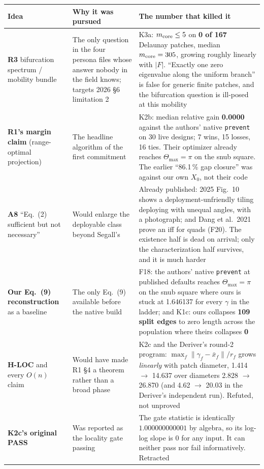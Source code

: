 \documentclass[10pt,a4paper]{article}
\begin{document}
\begin{table}[h]\centering\small
\begin{tabular}{@{}p{42mm}p{55mm}p{55mm}@{}}
\toprule
Idea & Why it was pursued & The number that killed it \\
\midrule
\textbf{R3} bifurcation spectrum / mobility bundle & The only question in the four persona files whose answer nobody in the field knows; targets 2026 \S6 limitation 2 & K3a: $m_{\rm core}\le5$ on \textbf{0 of 167} Delaunay patches, median $m_{\rm core} = 305$, growing roughly linearly with $|F|$. ``Exactly one zero eigenvalue along the uniform branch'' is false for generic finite patches, and the bifurcation question is ill-posed at this mobility \\
\textbf{R1's margin claim} (range-optimal projection) & The headline algorithm of the first commitment & K2b: median relative gain \textbf{0.0000} against the authors' native \texttt{prevent} on 30 live designs; 7 wins, 15 losses, 16 ties. Their optimizer already reaches $\Theta_{\max} = \pi$ on the snub square. The earlier ``86.1\,\% gap closure'' was against our own $X_0$, not their code \\
\textbf{A8} ``Eq.~(2) sufficient but not necessary'' & Would enlarge the deployable class beyond Segall's & Already published: 2025 Fig.~10 shows a deployment-unfriendly tiling deploying with unequal angles, with a photograph; and Dang et al.\ 2021 prove an iff for quads (F20). The existence half is dead on arrival; only the characterization half survives, and it is much harder \\
\textbf{Our Eq.~(9) reconstruction} as a baseline & The only Eq.~(9) available before the native build & F18: the authors' native \texttt{prevent} at published defaults reaches $\Theta_{\max} = \pi$ on the snub square where ours is stuck at 1.646137 for every $\gamma$ in the ladder; and K1c: ours collapses \textbf{109 split edges} to zero length across the population where theirs collapses \textbf{0} \\
\textbf{H-LOC} and every $O(n)$ claim & Would have made R1 \S4 a theorem rather than a broad phase & K2c and the Deriver's round-2 program: $\max_f\|\gamma_f - \bar x_f\|/r_f$ grows \emph{linearly} with patch diameter, 1.414 $\to$ 14.637 over diameters 2.828 $\to$ 26.870 (and 4.62 $\to$ 20.03 in the Deriver's independent run). Refuted, not unproved \\
\textbf{K2c's original PASS} & Was reported as the locality gate passing & The gate statistic is identically $1.000000000001$ by algebra, so its log-log slope is 0 for any input. It can neither pass nor fail informatively. Retracted \\

\end{tabular}
\end{table}
\end{document}
